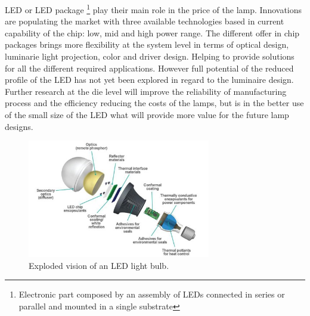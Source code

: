 %

LED or LED package \footnote{Electronic part composed by an assembly of LEDs connected in series or parallel and mounted in a single substrate} play their main role in the price of the lamp. Innovations are populating the market with three available technologies based in current capability of the chip: low, mid and high power range. The different offer in chip packages brings more flexibility at the system level in terms of optical design, luminarie light projection, color and driver design. Helping to provide solutions for all the different required applications. However full potential of the reduced profile of the LED has not yet been explored in regard to the luminaire design. Further research at the die level will improve the reliability of manufacturing process and the efficiency reducing the costs of the lamps, but is in the better use of the small size of the LED what will provide more value for the future lamp designs.

\begin{figure}[!h]
    \centering
    \includegraphics[width=8cm]{./0_intro/img/exploded_bulb_2.jpg}
    \caption{Exploded vision of an LED light bulb.}
    \label{fig:exploded_bulb}
\end{figure}


